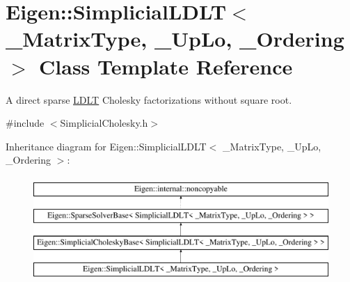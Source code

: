 \hypertarget{class_eigen_1_1_simplicial_l_d_l_t}{}\section{Eigen\+::Simplicial\+L\+D\+LT$<$ \+\_\+\+Matrix\+Type, \+\_\+\+Up\+Lo, \+\_\+\+Ordering $>$ Class Template Reference}
\label{class_eigen_1_1_simplicial_l_d_l_t}


A direct sparse \mbox{\hyperlink{class_eigen_1_1_l_d_l_t}{L\+D\+LT}} Cholesky factorizations without square root.  




{\ttfamily \#include $<$Simplicial\+Cholesky.\+h$>$}

Inheritance diagram for Eigen\+::Simplicial\+L\+D\+LT$<$ \+\_\+\+Matrix\+Type, \+\_\+\+Up\+Lo, \+\_\+\+Ordering $>$\+:\begin{figure}[H]
\begin{center}
\leavevmode
\includegraphics[height=4.000000cm]{class_eigen_1_1_simplicial_l_d_l_t}
\end{center}
\end{figure}
